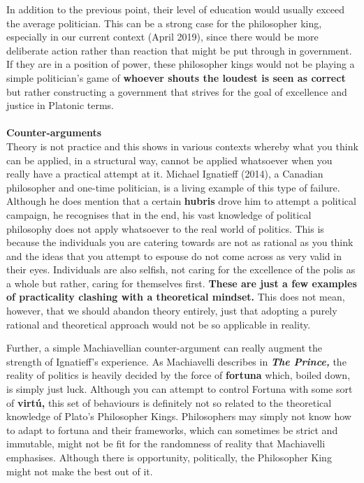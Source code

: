 \documentclass[12pt, letterpaper]{article}
\begin{document}
In addition to the previous point, their level of education would usually exceed the average politician. This can be a strong case for the philosopher king, especially in our current context (April 2019), since there would be more deliberate action rather than reaction that might be put through in government. If they are in a position of power, these philosopher kings would not be playing a simple politician's game of \textbf{whoever shouts the loudest is seen as correct} but rather constructing a government that strives for the goal of excellence and justice in Platonic terms.\\\\
\textbf{Counter-arguments}\\
Theory is not practice and this shows in various contexts whereby what you think can be applied, in a structural way, cannot be applied whatsoever when you really have a practical attempt at it. Michael Ignatieff (2014), a Canadian philosopher and one-time politician, is a living example of this type of failure. Although he does mention that a certain \textbf{hubris} drove him to attempt a political campaign, he recognises that in the end, his vast knowledge of political philosophy does not apply whatsoever to the real world of politics. This is because the individuals you are catering towards are not as rational as you think and the ideas that you attempt to espouse do not come across as very valid in their eyes. Individuals are also selfish, not caring for the excellence of the polis as a whole but rather, caring for themselves first. \textbf{These are just a few examples of practicality clashing with a theoretical mindset.} This does not mean, however, that we should abandon theory entirely, just that adopting a purely rational and theoretical approach would not be so applicable in reality.

Further, a simple Machiavellian counter-argument can really augment the strength of Ignatieff's experience. As Machiavelli describes in \textbf{\textit{The Prince,}} the reality of politics is heavily decided by the force of \textbf{fortuna} which, boiled down, is simply just luck. Although you can attempt to control Fortuna with some sort of \textbf{virtú,} this set of behaviours is definitely not so related to the theoretical knowledge of Plato's Philosopher Kings. Philosophers may simply not know how to adapt to fortuna and their frameworks, which can sometimes be strict and immutable, might not be fit for the randomness of reality that Machiavelli emphasises. Although there is opportunity, politically, the Philosopher King might not make the best out of it.
\end{document}
